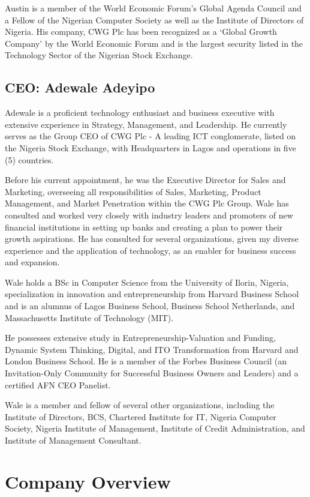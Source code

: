 \documentclass[a4paper,12pt]{report}
\begin{document}
	Austin is a member of the World Economic Forum’s Global Agenda Council and a Fellow of the Nigerian Computer Society as well as the Institute of Directors of Nigeria. His company, CWG Plc has been recognized as a ‘Global Growth Company’ by the World Economic Forum and is the largest security listed in the Technology Sector of the Nigerian Stock Exchange.
	
	\subsection{CEO: Adewale Adeyipo}
	Adewale is a proficient technology enthusiast and business executive with extensive experience in Strategy, Management, and Leadership. He currently serves as the Group CEO of CWG Plc - A leading ICT conglomerate, listed on the Nigeria Stock Exchange, with Headquarters in Lagos and operations in five (5) countries.
	
	Before his current appointment, he was the Executive Director for Sales and Marketing, overseeing all responsibilities of Sales, Marketing, Product Management, and Market Penetration within the CWG Plc Group. Wale has consulted and worked very closely with industry leaders and promoters of new financial institutions in setting up banks and creating a plan to power their growth aspirations. He has consulted for several organizations, given my diverse experience and the application of technology, as an enabler for business success and expansion.
	
	Wale holds a BSc in Computer Science from the University of Ilorin, Nigeria, specialization in innovation and entrepreneurship from Harvard Business School and is an alumnus of Lagos Business School, Business School Netherlands, and Massachusetts Institute of Technology (MIT).
	
	He possesses extensive study in Entrepreneurship-Valuation and Funding, Dynamic System Thinking, Digital, and ITO Transformation from Harvard and London Business School. He is a member of the Forbes Business Council (an Invitation-Only Community for Successful Business Owners and Leaders) and a certified AFN CEO Panelist.
	
	Wale is a member and fellow of several other organizations, including the Institute of Directors, BCS, Chartered Institute for IT, Nigeria Computer Society, Nigeria Institute of Management, Institute of Credit Administration, and Institute of Management Consultant.
	
	\section{Company Overview}
	
\end{document}
